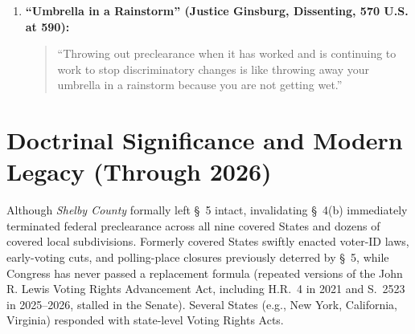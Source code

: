 \documentclass[12pt]{article}
\begin{document}
\begin{enumerate}
    \item \textbf{``Umbrella in a Rainstorm'' (Justice Ginsburg, Dissenting, 570 U.S. at 590):}
    \begin{quote}
    ``Throwing out preclearance when it has worked and is continuing to work to stop discriminatory changes is like throwing away your umbrella in a rainstorm because you are not getting wet.''
    \end{quote}
\end{enumerate}

\section{Doctrinal Significance and Modern Legacy (Through 2026)}

Although \emph{Shelby County} formally left \S~5 intact, invalidating \S~4(b) immediately terminated federal preclearance across all nine covered States and dozens of covered local subdivisions. Formerly covered States swiftly enacted voter-ID laws, early-voting cuts, and polling-place closures previously deterred by \S~5, while Congress has never passed a replacement formula (repeated versions of the John R. Lewis Voting Rights Advancement Act, including H.R.~4 in 2021 and S.~2523 in 2025--2026, stalled in the Senate). Several States (e.g., New York, California, Virginia) responded with state-level Voting Rights Acts.
\end{document}
